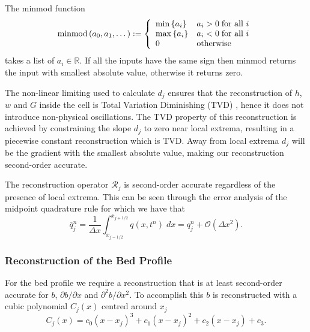 \begin{defn}
The minmod function
\begin{equation*}
\text{minmod}\left(a_0,a_1,\dots\right) := \left\lbrace \begin{array}{l l}
\min\left\lbrace a_i\right\rbrace & a_i > 0 \; \text{for all } i \\
\max\left\lbrace a_i\right\rbrace & a_i < 0  \; \text{for all } i \\
0 & \text{otherwise}\\
\end{array} \right.
\end{equation*}
takes a list of $a_i \in \mathbb{R}$. If all the inputs have the same sign then minmod returns the input with smallest absolute value, otherwise it returns zero. 
\end{defn}
The non-linear limiting used to calculate $d_j$ ensures that the reconstruction of $h$, $w$ and $G$ inside the cell is Total Variation Diminishing (TVD) \cite{Harten-1983-357}, hence it does not introduce non-physical oscillations. The TVD property of this reconstruction is achieved by constraining the slope $d_j$ to zero near local extrema, resulting in a piecewise constant reconstruction which is TVD. Away from local extrema $d_j$ will be the gradient with the smallest absolute value, making our reconstruction second-order accurate.

The reconstruction operator $\mathcal{R}_{j} $ is second-order accurate regardless of the presence of local extrema. This can be seen through the error analysis of the midpoint quadrature rule \cite{Davis-Rabinowitz-1984} for which we have that
\begin{equation}
\overline{q}^n_j = \frac{1}{\Delta x} \int_{x_{j-1/2}}^{x_{j+1/2}} q(x,t^n) \; dx = q_j^n + \mathcal{O}\left(\Delta x^2\right).
\end{equation}

\subsubsection{Reconstruction of the Bed Profile}
For the bed profile we require a reconstruction that is at least second-order accurate for $b$, $\partial b / \partial x$ and $\partial^2 b / \partial x^2$. To accomplish this $b$ is reconstructed with a cubic polynomial $C_j(x)$ centred around $x_j$
\begin{equation*}
C_j(x) = c_0 \left(x - x_j\right)^3 + c_1 \left(x - x_j\right)^2 + c_2 \left(x - x_j\right) + c_3.
\label{eqn:cubicforbedrecon}
\end{equation*}

